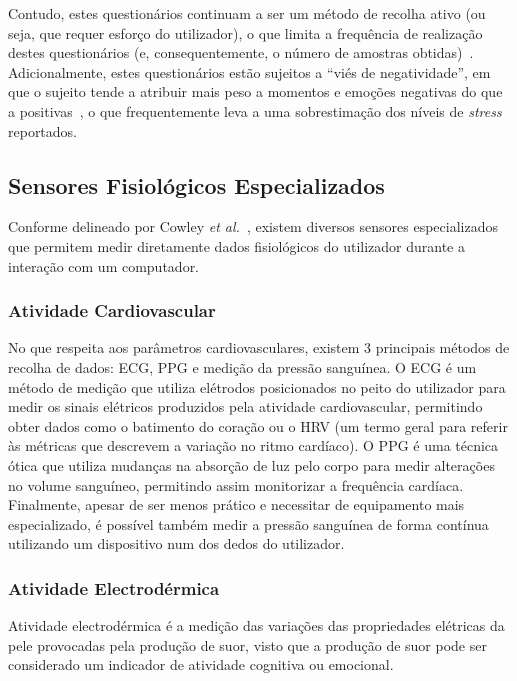 Contudo, estes questionários continuam a ser um método de recolha ativo (ou seja, que requer esforço do utilizador), o que limita a frequência de realização destes questionários (e, consequentemente, o número de amostras obtidas)~\cite{Kallio2025}.
Adicionalmente, estes questionários estão sujeitos a ``viés de negatividade'', em que o sujeito tende a atribuir mais peso a momentos e emoções negativas do que a positivas~\cite{Kallio2025}, o que frequentemente leva a uma sobrestimação dos níveis de \textit{stress} reportados.

\subsection{Sensores Fisiológicos Especializados}

Conforme delineado por Cowley \textit{et al.}~\cite{Cowley2016}, existem diversos sensores especializados que permitem medir diretamente dados fisiológicos do utilizador durante a interação com um computador.

\subsubsection{Atividade Cardiovascular}

No que respeita aos parâmetros cardiovasculares, existem 3 principais métodos de recolha de dados: \ac{ECG}, \ac{PPG} e medição da pressão sanguínea.
O \ac{ECG} é um método de medição que utiliza elétrodos posicionados no peito do utilizador para medir os sinais elétricos produzidos pela atividade cardiovascular, permitindo obter dados como o batimento do coração ou o \ac{HRV} (um termo geral para referir às métricas que descrevem a variação no ritmo cardíaco).
O \ac{PPG} é uma técnica ótica que utiliza mudanças na absorção de luz pelo corpo para medir alterações no volume sanguíneo, permitindo assim monitorizar a frequência cardíaca.
Finalmente, apesar de ser menos prático e necessitar de equipamento mais especializado, é possível também medir a pressão sanguínea de forma contínua utilizando um dispositivo num dos dedos do utilizador.

\subsubsection{Atividade Electrodérmica}

Atividade electrodérmica é a medição das variações das propriedades elétricas da pele provocadas pela produção de suor, visto que a produção de suor pode ser considerado um indicador de atividade cognitiva ou emocional.

